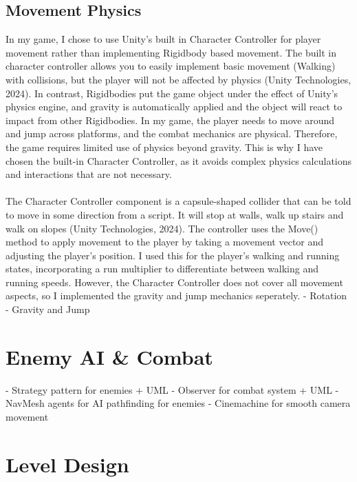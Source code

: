 \documentclass[]{final_report}
\begin{document}
\subsection{Movement Physics}
In my game, I chose to use Unity's built in Character Controller for player movement rather than implementing Rigidbody based movement. The built in character controller allows you to easily implement basic movement (Walking) with collisions, but the player will not be affected by physics (Unity Technologies, 2024). In contrast, Rigidbodies put the game object under the effect of Unity's physics engine, and gravity is automatically applied and the object will react to impact from other Rigidbodies. In my game, the player needs to move around and jump across platforms, and the combat mechanics are physical. Therefore, the game requires limited use of physics beyond gravity.  This is why I have chosen the built-in Character Controller, as it avoids complex physics calculations and interactions that are not necessary. 
\paragraph{}
The Character Controller component is a capsule-shaped collider that can be told to move in some direction from a script. It will stop at walls, walk up stairs and walk on slopes (Unity Technologies, 2024). The controller uses the Move() method to apply movement to the player by taking a movement vector and adjusting the player's position. I used this for the player's walking and running states, incorporating a run multiplier to differentiate between walking and running speeds. However, the Character Controller does not cover all movement aspects, so I implemented the gravity and jump mechanics seperately.  \newline
- Rotation
- Gravity and Jump
\section{Enemy AI \& Combat}
- Strategy pattern for enemies + UML \newline
- Observer for combat system + UML \newline
- NavMesh agents for AI pathfinding for enemies \newline
- Cinemachine for smooth camera movement \newline
\section{Level Design}
\end{document}
